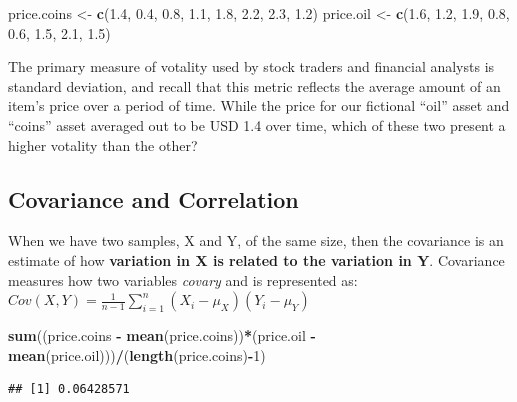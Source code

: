\documentclass[]{article}
\newenvironment{Shaded}{\begin{snugshade}}{\end{snugshade}}
\newcommand{\DecValTok}[1]{\textcolor[rgb]{0.00,0.00,0.81}{#1}}
\newcommand{\FloatTok}[1]{\textcolor[rgb]{0.00,0.00,0.81}{#1}}
\newcommand{\KeywordTok}[1]{\textcolor[rgb]{0.13,0.29,0.53}{\textbf{#1}}}
\newcommand{\NormalTok}[1]{#1}
\newcommand{\OperatorTok}[1]{\textcolor[rgb]{0.81,0.36,0.00}{\textbf{#1}}}
\newcommand{\StringTok}[1]{\textcolor[rgb]{0.31,0.60,0.02}{#1}}
\begin{document}
\begin{Shaded}
\begin{Highlighting}[]
\NormalTok{price.coins <-}\StringTok{ }\KeywordTok{c}\NormalTok{(}\FloatTok{1.4}\NormalTok{, }\FloatTok{0.4}\NormalTok{, }\FloatTok{0.8}\NormalTok{, }\FloatTok{1.1}\NormalTok{, }\FloatTok{1.8}\NormalTok{, }\FloatTok{2.2}\NormalTok{, }\FloatTok{2.3}\NormalTok{, }\FloatTok{1.2}\NormalTok{)}
\NormalTok{price.oil <-}\StringTok{ }\KeywordTok{c}\NormalTok{(}\FloatTok{1.6}\NormalTok{, }\FloatTok{1.2}\NormalTok{, }\FloatTok{1.9}\NormalTok{, }\FloatTok{0.8}\NormalTok{, }\FloatTok{0.6}\NormalTok{, }\FloatTok{1.5}\NormalTok{, }\FloatTok{2.1}\NormalTok{, }\FloatTok{1.5}\NormalTok{)}
\end{Highlighting}
\end{Shaded}

The primary measure of votality used by stock traders and financial
analysts is standard deviation, and recall that this metric reflects the
average amount of an item's price over a period of time. While the price
for our fictional ``oil'' asset and ``coins'' asset averaged out to be
USD 1.4 over time, which of these two present a higher votality than the
other?

\hypertarget{covariance-and-correlation}{%
\subsection{Covariance and
Correlation}\label{covariance-and-correlation}}

When we have two samples, X and Y, of the same size, then the covariance
is an estimate of how \textbf{variation in X is related to the variation
in Y}. Covariance measures how two variables \emph{covary} and is
represented as:\\
\(Cov(X, Y) = \frac{1}{n-1}\sum\limits^n_{i=1}(X_i - \mu_X)(Y_i - \mu_Y)\)

\begin{Shaded}
\begin{Highlighting}[]
\KeywordTok{sum}\NormalTok{((price.coins }\OperatorTok{-}\StringTok{ }\KeywordTok{mean}\NormalTok{(price.coins))}\OperatorTok{*}\NormalTok{(price.oil }\OperatorTok{-}\StringTok{ }\KeywordTok{mean}\NormalTok{(price.oil)))}\OperatorTok{/}\NormalTok{(}\KeywordTok{length}\NormalTok{(price.coins)}\OperatorTok{-}\DecValTok{1}\NormalTok{)}
\end{Highlighting}
\end{Shaded}

\begin{verbatim}
## [1] 0.06428571
\end{verbatim}
\end{document}

